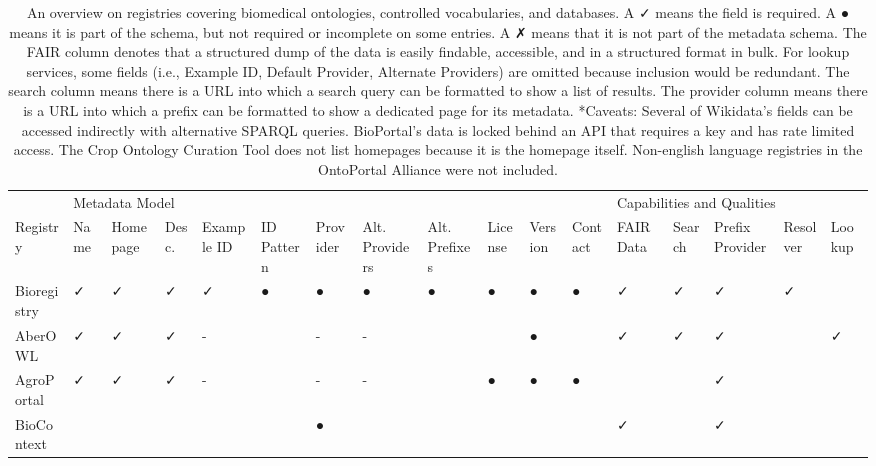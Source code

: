 \begin{table}
\centering
\caption{An overview on registries covering biomedical ontologies, controlled vocabularies, and databases. A ✓ means the field is required. A ● means it is part of the schema, but not required or incomplete on some entries. A ✗ means that it is not part of the metadata schema. The FAIR column denotes that a structured dump of the data is easily findable, accessible, and in a structured format in bulk. For lookup services, some fields (i.e., Example ID, Default Provider, Alternate Providers) are omitted because inclusion would be redundant. The search column means there is a URL into which a search query can be formatted to show a list of results. The provider column means there is a URL into which a prefix can be formatted to show a dedicated page for its metadata. *Caveats: Several of Wikidata's fields can be accessed indirectly with alternative SPARQL queries. BioPortal's data is locked behind an API that requires a key and has rate limited access. The Crop Ontology Curation Tool does not list homepages because it is the homepage itself. Non-english language registries in the OntoPortal Alliance were not included.}
\label{tab:registry-comparison-governance}
\begin{tabular}{lllllllllllllllll}
\toprule
                & \multicolumn{11}{l}{Metadata Model} & \multicolumn{5}{l}{Capabilities and Qualities} \\
       Registry &           Name & Homepage & Desc. & Example ID & ID Pattern & Provider & Alt. Providers & Alt. Prefixes & License & Version & Contact &                  FAIR Data & Search & Prefix Provider & Resolver & Lookup \\
\midrule
    Bioregistry &              ✓ &        ✓ &     ✓ &          ✓ &          ● &        ● &              ● &             ● &       ● &       ● &       ● &                          ✓ &      ✓ &               ✓ &        ✓ &        \\
        AberOWL &              ✓ &        ✓ &     ✓ &          - &            &        - &              - &               &         &       ● &         &                          ✓ &      ✓ &               ✓ &          &      ✓ \\
     AgroPortal &              ✓ &        ✓ &     ✓ &          - &            &        - &              - &               &       ● &       ● &       ● &                            &        &               ✓ &          &        \\
     BioContext &                &          &       &            &            &        ● &                &               &         &         &         &                          ✓ &        &               ✓ &          &        \\

\end{tabular}
\end{table}
